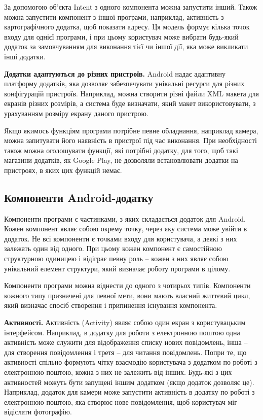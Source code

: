 \documentclass[../main.tex]{subfiles}
\begin{document}
За допомогою об'єкта Intent з одного компонента можна запустити інший. Також можна запустити компонент з іншої програми, наприклад, активність з картографічного додатка, щоб показати адресу. Ця модель формує кілька точок входу для однієї програми, і при цьому користувач може вибрати будь-який додаток за замовчуванням для виконання тієї чи іншої дії, яка може викликати інші додатки.
	
\textbf{Додатки адаптуються до різних пристроїв.} 
Android надає адаптивну платформу додатків, яка дозволяє забезпечувати унікальні ресурси для різних конфігурацій пристроїв. Наприклад, можна створити різні файли XML макета для екранів різних розмірів, а система буде визначати, який макет використовувати, з урахуванням розміру екрану даного пристрою.

Якщо якимось функціям програми потрібне певне обладнання, наприклад камера, можна запитувати його наявність в пристрої під час виконання. При необхідності також можна оголошувати функції, які потрібні додатку, для того, щоб такі магазини додатків, як Google Play, не дозволяли встановлювати додатки на пристроях, в яких цих функцій немає.

\subsection{Компоненти Android-додатку}

Компоненти програми є частинками, з яких складається додаток для Android. Кожен компонент являє собою окрему точку, через яку система може увійти в додаток. Не всі компоненти є точками входу для користувача, а деякі з них залежать один від одного. При цьому кожен компонент є самостійною структурною одиницею і відіграє певну роль -- кожен з них являє собою унікальний елемент структури, який визначає роботу програми в цілому.

Компоненти програми можна віднести до одного з чотирьох типів. Компоненти кожного типу призначені для певної мети, вони мають власний життєвий цикл, який визначає спосіб створення і припинення існування компонента.

\textbf{Активності.} Активність (Activity) являє собою один екран з користувацьким інтерфейсом. Наприклад, в додатку для роботи з електронною поштою одна активність може служити для відображення списку нових повідомлень, інша -- для створення повідомлення і третя -- для читання повідомлень. Попри те, що активності спільно формують чітку взаємодію користувача з додатком по роботі з електронною поштою, кожна з них не залежить від інших. Будь-які з цих активностей можуть бути запущені іншим додатком (якщо додаток дозволяє це). Наприклад, додаток для камери може запустити активність в додатку по роботі з електронною поштою, яка створює нове повідомлення, щоб користувач міг відіслати фотографію.
\end{document}
